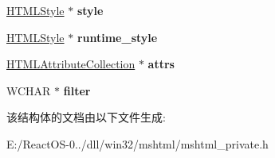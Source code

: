 \begin{DoxyCompactItemize}
\hyperlink{struct_h_t_m_l_style}{H\+T\+M\+L\+Style} $\ast$ {\bfseries style}
\item 
\mbox{\label{struct_h_t_m_l_element_a4bbd6a8a101e6fbca14444a30dc33929}} 
\hyperlink{struct_h_t_m_l_style}{H\+T\+M\+L\+Style} $\ast$ {\bfseries runtime\+\_\+style}
\item 
\mbox{\label{struct_h_t_m_l_element_a878b0f6cffa19e5d6a09b07d54cc26ee}} 
\hyperlink{struct_h_t_m_l_attribute_collection}{H\+T\+M\+L\+Attribute\+Collection} $\ast$ {\bfseries attrs}
\item 
\mbox{\label{struct_h_t_m_l_element_ac37fd356eda2aed08e80fe3a4a56b7ee}} 
W\+C\+H\+AR $\ast$ {\bfseries filter}
\end{DoxyCompactItemize}


该结构体的文档由以下文件生成\+:\begin{DoxyCompactItemize}
\item 
E\+:/\+React\+O\+S-\/0../dll/win32/mshtml/mshtml\+\_\+private.\+h\end{DoxyCompactItemize}

